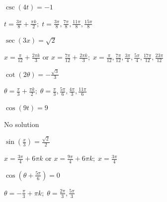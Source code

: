 \documentclass{ximera}
\begin{document}
\begin{question}
\begin{problem}
$\csc \left( 4 t \right) = -1$

\begin{solution}
$t = \frac{3\pi}{8} + \frac{\pi k}{2}; \; t = \frac{3\pi}{8}, \frac{7\pi}{8}, \frac{11\pi}{8}, \frac{15\pi}{8}$
\end{solution}
\end{problem}

\begin{problem}
$\sec \left( 3x \right) = \sqrt{2}$

\begin{solution}
$x = \frac{\pi}{12} + \frac{2\pi k}{3}$ or $x = \frac{7\pi}{12} + \frac{2\pi k}{3}; \; x = \frac{\pi}{12}, \frac{7\pi}{12}, \frac{3\pi}{4}, \frac{5\pi}{4}, \frac{17\pi}{12}, \frac{23\pi}{12}$
\end{solution}
\end{problem}

\begin{problem}
$\cot \left( 2 \theta \right) = -\frac{\sqrt{3}}{3}$

\begin{solution}
$\theta  = \frac{\pi}{3} + \frac{\pi k}{2}; \; \theta  = \frac{\pi}{3}, \frac{5\pi}{6}, \frac{4\pi}{3}, \frac{11\pi}{6}$
\end{solution}
\end{problem}

\begin{problem}
$\cos \left( 9t  \right) = 9$

\begin{solution}
No solution
\end{solution}
\end{problem}

\begin{problem}
$\sin \left( \frac{x}{3} \right) = \frac{\sqrt{2}}{2}$

\begin{solution}
$x = \frac{3\pi}{4} + 6\pi k$ or $x = \frac{9\pi}{4} + 6\pi k; \; x = \frac{3\pi}{4}$
\end{solution}
\end{problem}

\begin{problem}
$\cos \left( \theta+ \frac{5\pi}{6} \right) = 0$

\begin{solution}
$\theta = -\frac{\pi}{3} + \pi k; \; \theta  = \frac{2\pi}{3}, \frac{5\pi}{3}$
\end{solution}
\end{problem}


\end{question}
\end{document}
